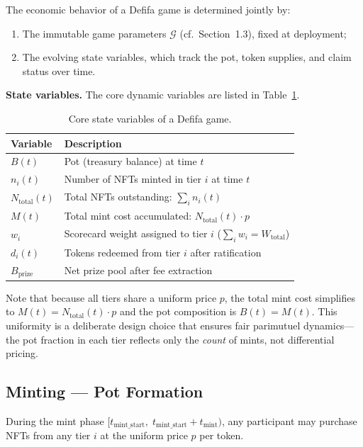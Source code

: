 \documentclass[11pt,a4paper]{article}
\begin{document}
The economic behavior of a Defifa game is determined jointly by:
\begin{enumerate}[nosep]
    \item The immutable game parameters $\mathcal{G}$ (cf.\ Section~1.3), fixed at deployment;
    \item The evolving state variables, which track the pot, token supplies, and claim status over time.
\end{enumerate}

\textbf{State variables.} The core dynamic variables are listed in Table~\ref{tab:state}.

\begin{table}[H]
\centering
\begin{tabular}{ll}
\toprule
\textbf{Variable} & \textbf{Description} \\
\midrule
$B(t)$ & Pot (treasury balance) at time $t$ \\
$n_i(t)$ & Number of NFTs minted in tier $i$ at time $t$ \\
$N_{\text{total}}(t)$ & Total NFTs outstanding: $\sum_i n_i(t)$ \\
$M(t)$ & Total mint cost accumulated: $N_{\text{total}}(t) \cdot p$ \\
$w_i$ & Scorecard weight assigned to tier $i$ ($\sum_i w_i = W_{\text{total}}$) \\
$d_i(t)$ & Tokens redeemed from tier $i$ after ratification \\
$B_{\text{prize}}$ & Net prize pool after fee extraction \\
\bottomrule
\end{tabular}
\caption{Core state variables of a Defifa game.}
\label{tab:state}
\end{table}

Note that because all tiers share a uniform price $p$, the total mint cost simplifies to $M(t) = N_{\text{total}}(t) \cdot p$ and the pot composition is $B(t) = M(t)$. This uniformity is a deliberate design choice that ensures fair parimutuel dynamics---the pot fraction in each tier reflects only the \emph{count} of mints, not differential pricing.

\subsection{Minting --- Pot Formation}

During the mint phase $[t_{\text{mint\_start}},\; t_{\text{mint\_start}} + t_{\text{mint}})$, any participant may purchase NFTs from any tier $i$ at the uniform price $p$ per token.
\end{document}
